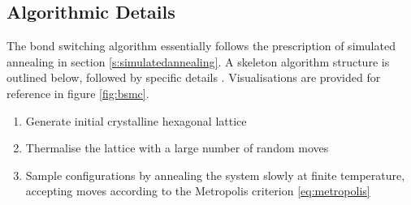 \subsection{Algorithmic Details} 

The \td{} bond switching algorithm essentially follows the prescription of simulated annealing in section \ref{s:simulatedannealing}.
A skeleton algorithm structure is outlined below, followed by specific details \cite{Kumar2012}.
Visualisations are provided for reference in figure \ref{fig:bsmc}.

\begin{enumerate}
	\item Generate initial crystalline hexagonal lattice
	\item Thermalise the lattice with a large number of random moves 
	\item Sample configurations by annealing the system slowly at finite temperature, accepting moves according to the Metropolis criterion \eqref{eq:metropolis}
\end{enumerate}
